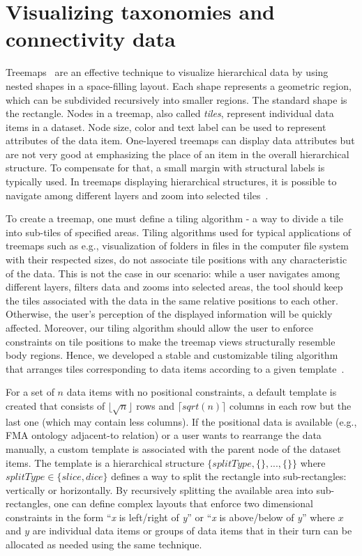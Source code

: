 \section{Visualizing taxonomies and connectivity data}
\label{sect:visualization}

Treemaps~\cite{JS91} are an effective technique to visualize hierarchical data by using nested shapes in a space-filling layout.
Each shape represents a geometric region, which can be subdivided recursively into smaller regions. The standard shape is the rectangle.
Nodes in a treemap, also called \emph{tiles}, represent individual data items in a dataset. Node size, color and text label can be used to represent attributes of the data item. One-layered treemaps can display data attributes but are not very good at emphasizing the place of an item in the overall hierarchical structure. To compensate for that, a small margin with structural labels is typically used. In treemaps displaying hierarchical structures, it is possible to navigate among different layers and zoom into selected tiles~\cite{BL07}.

To create a treemap, one must define a tiling algorithm - a way to divide a tile into sub-tiles of specified areas.
Tiling algorithms used for typical applications of treemaps such as e.g., visualization of folders in files in the computer file system with their respected sizes, do not associate tile positions with any characteristic of the data. This is not the case in our scenario: while a user navigates among different layers, filters data and zooms into selected areas, the tool should keep the tiles associated with the data in the same relative positions to each other. Otherwise, the user's perception of the displayed information will be quickly affected. Moreover, our tiling algorithm should allow the user to enforce constraints on tile positions to make the treemap views structurally resemble body regions. Hence, we developed a stable and customizable tiling algorithm that arranges tiles corresponding to data items according to a given template~\cite{KBK14}.

For a set of $n$ data items with no positional constraints, a default template is created that consists of $\lfloor \sqrt{n} \rfloor$ rows and $\lceil sqrt(n) \rceil$ columns in each row but the last one (which may contain less columns). If the positional data is available (e.g., FMA ontology adjacent-to relation) or a user wants to rearrange the data manually, a custom template is associated with the parent node of the dataset items. The template is a hierarchical structure
$\{splitType, \{\},..., \{\}\}$ where $splitType \in \{slice, dice\}$ defines a way to split the rectangle into sub-rectangles: vertically or horizontally. By recursively splitting the available area into sub-rectangles, one can define complex layouts that enforce two dimensional constraints in the form ``\emph{x} is left/right of \emph{y}'' or ``\emph{x} is above/below of \emph{y}'' where $x$ and $y$ are individual data items or groups of data items that in their turn can be allocated as needed using the same technique.


